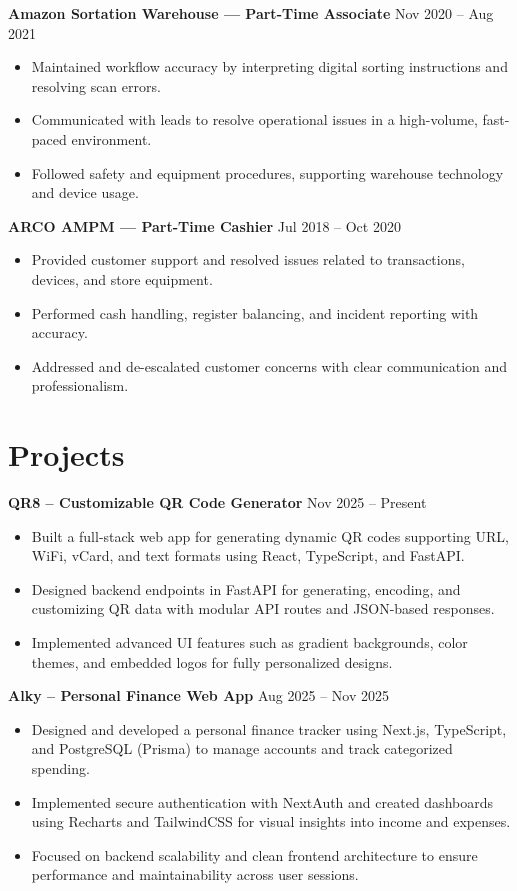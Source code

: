\documentclass[a4paper,9.5pt]{article}
\newcommand{\dateright}[1]{\hfill {\small\textnormal{#1}}}
\begin{document}
\textbf{Amazon Sortation Warehouse — Part-Time Associate} \dateright{Nov 2020 – Aug 2021}
\begin{itemize}
  \item Maintained workflow accuracy by interpreting digital sorting instructions and resolving scan errors.
  \item Communicated with leads to resolve operational issues in a high-volume, fast-paced environment.
  \item Followed safety and equipment procedures, supporting warehouse technology and device usage.
\end{itemize}

\textbf{ARCO AMPM — Part-Time Cashier} \dateright{Jul 2018 – Oct 2020}
\begin{itemize}
  \item Provided customer support and resolved issues related to transactions, devices, and store equipment.
  \item Performed cash handling, register balancing, and incident reporting with accuracy.
  \item Addressed and de-escalated customer concerns with clear communication and professionalism.
\end{itemize}

\section*{Projects}

\textbf{QR8 – Customizable QR Code Generator} \dateright{Nov 2025 – Present}
\begin{itemize}
  \item Built a full-stack web app for generating dynamic QR codes supporting URL, WiFi, vCard, and text formats using React, TypeScript, and FastAPI.
  \item Designed backend endpoints in FastAPI for generating, encoding, and customizing QR data with modular API routes and JSON-based responses.
  \item Implemented advanced UI features such as gradient backgrounds, color themes, and embedded logos for fully personalized designs.
\end{itemize}

\textbf{Alky – Personal Finance Web App} \dateright{Aug 2025 – Nov 2025}
\begin{itemize}
  \item Designed and developed a personal finance tracker using Next.js, TypeScript, and PostgreSQL (Prisma) to manage accounts and track categorized spending.
  \item Implemented secure authentication with NextAuth and created dashboards using Recharts and TailwindCSS for visual insights into income and expenses.
  \item Focused on backend scalability and clean frontend architecture to ensure performance and maintainability across user sessions.
\end{itemize}
\end{document}
